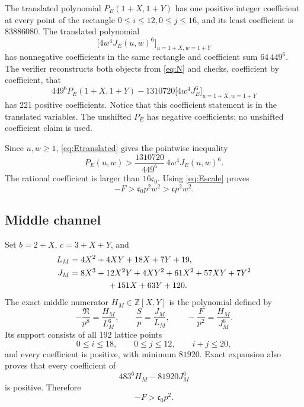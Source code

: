 The translated polynomial \(P_E(1+X,1+Y)\) has one positive integer
coefficient at every point of the rectangle
\(0\le i\le12,0\le j\le16\), and its least coefficient is \(83886080\).
The translated polynomial
\[
 \bigl[4w^4J_E(u,w)^6\bigr]_{u=1+X,w=1+Y}
\]
has nonnegative coefficients in the same rectangle and coefficient sum
\(64\,449^6\). The verifier reconstructs both objects from \eqref{eq:N} and
checks, coefficient by coefficient, that
\begin{equation}\label{eq:Etranslated}
 449^6P_E(1+X,1+Y)
 -1310720\bigl[4w^4J_E^6\bigr]_{u=1+X,w=1+Y}
\end{equation}
has 221 positive coefficients. Notice that this coefficient statement is in
the translated variables. The unshifted \(P_E\) has negative coefficients;
no unshifted coefficient claim is used.

Since \(u,w\ge1\), \eqref{eq:Etranslated} gives the pointwise inequality
\[
 P_E(u,w)>\frac{1310720}{449^6}\,4w^4J_E(u,w)^6.
\]
The rational coefficient is larger than \(16\mathfrak c_0\). Using
\eqref{eq:Escale} proves
\begin{equation}\label{eq:E-margin}
 -F>\mathfrak c_0p^2w^2>\mathfrak c p^2w^2.
\end{equation}

\subsection{Middle channel}

Set \(b=2+X\), \(c=3+X+Y\), and
\begin{align*}
 L_M&=4X^2+4XY+18X+7Y+19,\\
 J_M&=8X^3+12X^2Y+4XY^2+61X^2+57XY+7Y^2\\
 &\hspace{16mm}+151X+63Y+120.
\end{align*}
The exact middle numerator \(H_M\in\mathbb Z[X,Y]\) is the polynomial defined
by
\[
 -\frac{\mathfrak N}{p^8}=\frac{H_M}{L_M^6},
 \qquad
 \frac Sp=\frac{J_M}{L_M},
 \qquad
 -\frac F{p^2}=\frac{H_M}{J_M^6}.
\]
Its support consists of all 192 lattice points
\[
 0\le i\le18,\qquad0\le j\le12,\qquad i+j\le20,
\]
and every coefficient is positive, with minimum \(81920\). Exact expansion
also proves that every coefficient of
\begin{equation}\label{eq:Mbase-residual}
 483^6H_M-81920J_M^6
\end{equation}
is positive. Therefore
\begin{equation}\label{eq:Mbase}
 -F>\mathfrak c_0p^2.
\end{equation}

